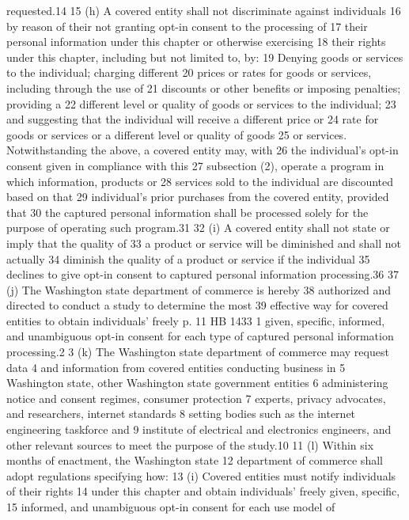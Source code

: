 requested.14
15 (h) A covered entity shall not discriminate against individuals
16 by reason of their not granting opt-in consent to the processing of
17 their personal information under this chapter or otherwise exercising
18 their rights under this chapter, including but not limited to, by:
19 Denying goods or services to the individual; charging different
20 prices or rates for goods or services, including through the use of
21 discounts or other benefits or imposing penalties; providing a
22 different level or quality of goods or services to the individual;
23 and suggesting that the individual will receive a different price or
24 rate for goods or services or a different level or quality of goods
25 or services. Notwithstanding the above, a covered entity may, with
26 the individual's opt-in consent given in compliance with this
27 subsection (2), operate a program in which information, products or
28 services sold to the individual are discounted based on that
29 individual's prior purchases from the covered entity, provided that
30 the captured personal information shall be processed solely for the
purpose of operating such program.31
32 (i) A covered entity shall not state or imply that the quality of
33 a product or service will be diminished and shall not actually
34 diminish the quality of a product or service if the individual
35 declines to give opt-in consent to captured personal information
processing.36
37 (j) The Washington state department of commerce is hereby
38 authorized and directed to conduct a study to determine the most
39 effective way for covered entities to obtain individuals' freely
p. 11 HB 1433
1 given, specific, informed, and unambiguous opt-in consent for each
type of captured personal information processing.2
3 (k) The Washington state department of commerce may request data
4 and information from covered entities conducting business in
5 Washington state, other Washington state government entities
6 administering notice and consent regimes, consumer protection
7 experts, privacy advocates, and researchers, internet standards
8 setting bodies such as the internet engineering taskforce and
9 institute of electrical and electronics engineers, and other relevant
sources to meet the purpose of the study.10
11 (l) Within six months of enactment, the Washington state
12 department of commerce shall adopt regulations specifying how:
13 (i) Covered entities must notify individuals of their rights
14 under this chapter and obtain individuals' freely given, specific,
15 informed, and unambiguous opt-in consent for each use model of
